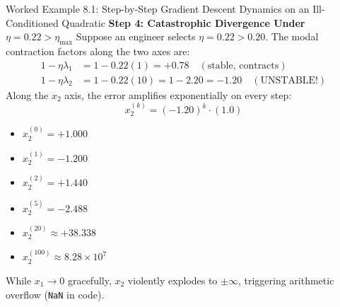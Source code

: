 \begin{examplebox}[breakable]{Worked Example 8.1: Step-by-Step Gradient Descent Dynamics on an Ill-Conditioned Quadratic}
\textbf{Step 4: Catastrophic Divergence Under $\eta = 0.22 > \eta_{\max}$}
Suppose an engineer selects $\eta = 0.22 > 0.20$.
The modal contraction factors along the two axes are:
\begin{align}
1 - \eta \lambda_1 &= 1 - 0.22(1) = +0.78 \quad (\text{stable, contracts}) \\
1 - \eta \lambda_2 &= 1 - 0.22(10) = 1 - 2.20 = -1.20 \quad (\text{UNSTABLE!})
\end{align}
Along the $x_2$ axis, the error amplifies exponentially on every step:
\begin{equation}
x_2^{(k)} = (-1.20)^k \cdot (1.0)
\end{equation}
\begin{itemize}
    \item $x_2^{(0)} = +1.000$
    \item $x_2^{(1)} = -1.200$
    \item $x_2^{(2)} = +1.440$
    \item $x_2^{(5)} = -2.488$
    \item $x_2^{(20)} \approx +38.338$
    \item $x_2^{(100)} \approx 8.28 \times 10^7$
\end{itemize}
While $x_1 \to 0$ gracefully, $x_2$ violently explodes to $\pm \infty$, triggering arithmetic overflow (\texttt{NaN} in code).
\end{examplebox}

